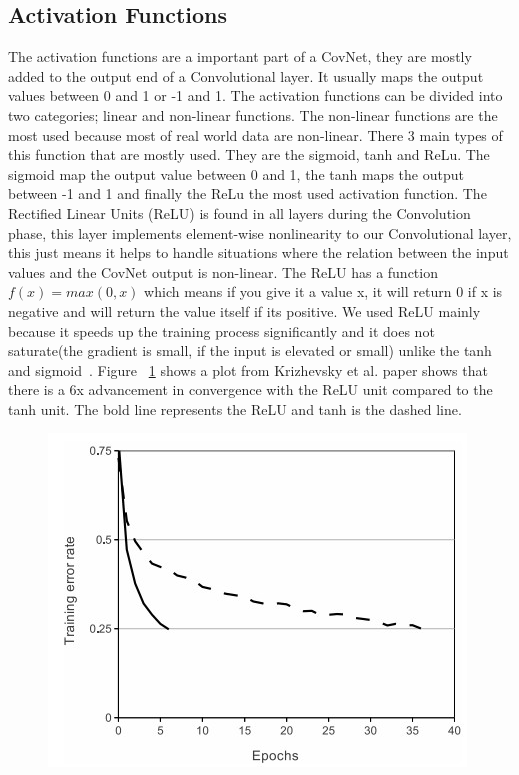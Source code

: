 \documentclass[12pt, a4paper,oneside]{report}
\begin{document}
\subsection{Activation Functions}
The activation functions are a important part of a CovNet, they are mostly added to the output end of a Convolutional layer. It usually maps the output values between 0 and 1 or -1 and 1. The activation functions can be divided into two categories; linear and non-linear functions. The non-linear functions are the most used because most of real world data are non-linear. There 3 main types of this function that are mostly used. They are the sigmoid, tanh and ReLu. The sigmoid map the output value between 0 and 1, the tanh maps the output between -1 and 1 and finally the ReLu the most used activation function. The Rectified Linear Units (ReLU) is found in all layers during the Convolution phase, this layer implements element-wise nonlinearity to our Convolutional layer, this just means it helps to handle situations where the relation between the input values and the CovNet output is non-linear. The ReLU has a function \(f(x) = max(0,x)\) which means if you give it a value x, it will return 0 if x is negative and will return the value itself if its positive. We used ReLU mainly because it speeds up the training process significantly and it does not saturate(the gradient is small, if the input is elevated or small) unlike the tanh and sigmoid~\cite{relu}. Figure ~\ref{fig:relu} shows a plot from Krizhevsky et al. \cite{krizhevsky2012imagenet} paper shows that there is a 6x advancement in convergence with the ReLU unit compared to the tanh unit. The bold line represents the ReLU and tanh is the dashed line.

\begin{figure}
	\includegraphics [scale=0.9] {relu}
	\label{fig:relu}
\end{figure}
\end{document}
